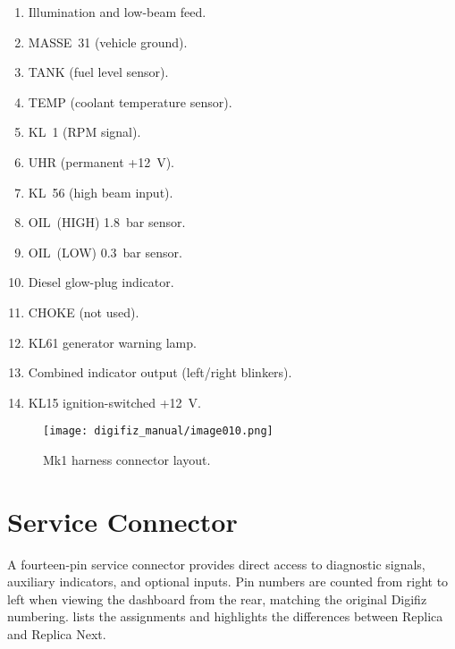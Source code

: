 \begin{enumerate}
    \item Illumination and low-beam feed.
    \item MASSE~31 (vehicle ground).
    \item TANK (fuel level sensor).
    \item TEMP (coolant temperature sensor).
    \item KL~1 (RPM signal).
    \item UHR (permanent +12~V).
    \item KL~56 (high beam input).
    \item OIL~(HIGH) 1.8~bar sensor.
    \item OIL~(LOW) 0.3~bar sensor.
    \item Diesel glow-plug indicator.
    \item CHOKE (not used).
    \item KL61 generator warning lamp.
    \item Combined indicator output (left/right blinkers).
    \item KL15 ignition-switched +12~V.
\end{enumerate}

\begin{figure}[htbp]
    \centering
    \texttt{[image: digifiz\_manual/image010.png]}
    \caption{Mk1 harness connector layout.}
    \label{fig:mk1-wiring}
\end{figure}

\section{Service Connector}

A fourteen-pin service connector provides direct access to diagnostic signals, auxiliary indicators, and optional inputs.
Pin numbers are counted from right to left when viewing the dashboard from the rear, matching the original Digifiz numbering.
 lists the assignments and highlights the differences between Replica and Replica Next.

